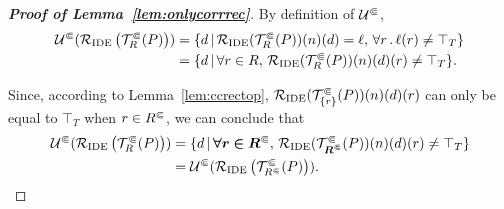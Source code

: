 \onlycorrrec*
\begin{proof}[\textbf{Proof of Lemma~\ref{lem:onlycorrrec}}]
  By definition of $\mathcal U^\Subset$,
  \begin{align*}
    \mathcal U^\Subset(\mathcal R_{\text{IDE}}\left(\mathcal T^\Subset_R(P)\right))
    &=\{d\,|\,\mathcal R_{\text{IDE}}(\mathcal T^\Subset_R(P))(n)(d)=\ell,\,\forall r\,.\,\ell(r)\ne\top_T\}\\
    &=\{d\,|\,\forall r\in R,\,\mathcal R_{\text{IDE}}(\mathcal T^\Subset_R(P))(n)(d)(r)\ne\top_T\}.
  \end{align*}
  
Since, according to Lemma~\ref{lem:ccrectop}, $\mathcal R_{\text{IDE}}(\mathcal T^\Subset_{\{r\}}(P))(n)(d)(r)$ can only be equal to $\top_T$ when $r\in{R^\Subset}$, we can conclude that
  \begin{align*}
    \mathcal U^\Subset(\mathcal R_{\text{IDE}}\left(\mathcal T^\Subset_R(P)\right))
    &=\{d\,|\,\bm{\forall r\in{R^\Subset}},\,\mathcal R_{\text{IDE}}(\mathcal T^\Subset_{\bm{{R^\Subset}}}(P))(n)(d)(r)\ne\top_T\}\\
    &=\mathcal U^\Subset(\mathcal R_{\text{IDE}}\left(\mathcal T^\Subset_{R^\Subset}(P)\right)).
    \qedhere
  \end{align*}
\end{proof}
